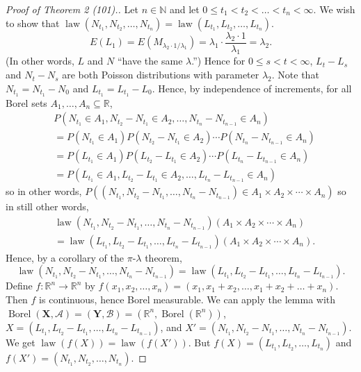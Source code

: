 \documentclass{article}
\DeclareMathOperator{\law}{law}
\DeclareMathOperator{\Borel}{Borel}
\newcommand{\R}{\mathbb{R}}
\newcommand{\N}{\mathbb{N}}
\theoremstyle{definition}
\begin{document}
\begin{proof}[Proof of Theorem 2 (101).]
    Let $n \in \N$ and let $0 \leq t_1 < t_2 < \dots < t_n < \infty$. We wish to show that $\law(N_{t_1}, N_{t_2}, \dots, N_{t_n}) = \law(L_{t_1}, L_{t_2}, \dots, L_{t_n})$.
    \[
        E(L_1) = E(M_{\lambda_2 \cdot 1/\lambda_1}) = \lambda_1 \cdot \frac{\lambda_2 \cdot 1}{\lambda_1} = \lambda_2.
    \]
    (In other words, $L$ and $N$ ``have the same $\lambda$.'') Hence for $0 \leq s < t < \infty$, $L_t - L_s$ and $N_t - N_s$ are both Poisson distributions with parameter $\lambda_2$. Note that $N_{t_1} = N_{t_1} - N_0$ and $L_{t_1} = L_{t_1} - L_0$. Hence, by independence of increments, for all Borel sets $A_1, \dots, A_n \subseteq \R$,
    \begin{align*}
        &P(N_{t_1} \in A_1, N_{t_2} - N_{t_1} \in A_2, \dots, N_{t_n} - N_{t_{n-1}} \in A_n) \\
        &= P(N_{t_1} \in A_1) P(N_{t_2} - N_{t_1} \in A_2) \cdots P(N_{t_n} - N_{t_{n-1}} \in A_n) \\
        &= P(L_{t_1} \in A_1) P(L_{t_2} - L_{t_1} \in A_2) \cdots P(L_{t_n} - L_{t_{n-1}} \in A_n) \\
        &= P(L_{t_1} \in A_1, L_{t_2} - L_{t_1} \in A_2, \dots, L_{t_n} - L_{t_{n-1}} \in A_n)
    \end{align*}
    so in other words, $P((N_{t_1}, N_{t_2} - N_{t_1}, \dots, N_{t_n} - N_{t_{n-1}}) \in A_1 \times A_2 \times \cdots \times A_n)$ so in still other words,
    \begin{align*}
        &\law(N_{t_1}, N_{t_2} - N_{t_1}, \dots, N_{t_n} - N_{t_{n-1}})(A_1 \times A_2 \times \cdots \times A_n) \\
        &= \law(L_{t_1}, L_{t_2} - L_{t_1}, \dots, L_{t_n} - L_{t_{n-1}})(A_1 \times A_2 \times \cdots \times A_n).
    \end{align*}
    Hence, by a corollary of the $\pi$-$\lambda$ theorem,
    \[
        \law(N_{t_1}, N_{t_2} - N_{t_1}, \dots, N_{t_n} - N_{t_{n-1}})
        = \law(L_{t_1}, L_{t_2} - L_{t_1}, \dots, L_{t_n} - L_{t_{n-1}}).
    \]
    Define $f : \R^n \to \R^n$ by $f(x_1, x_2, \dots, x_n) = (x_1, x_1 + x_2, \dots, x_1 + x_2 + \dots + x_n)$. Then $f$ is continuous, hence Borel measurable. We can apply the lemma with $\Borel(\mathbf{X}, \mathscr{A}) = (\mathbf{Y}, \mathscr{B}) = (\R^n, \Borel(\R^n))$, $X = (L_{t_1}, L_{t_2} - L_{t_1}, \dots, L_{t_n} - L_{t_{n-1}})$, and $X' = (N_{t_1}, N_{t_2} - N_{t_1}, \dots, N_{t_n} - N_{t_{n-1}})$. We get $\law(f(X)) = \law(f(X'))$. But $f(X) = (L_{t_1}, L_{t_2}, \dots, L_{t_n})$ and $f(X') = (N_{t_1}, N_{t_2}, \dots, N_{t_n})$.
\end{proof}
\end{document}
